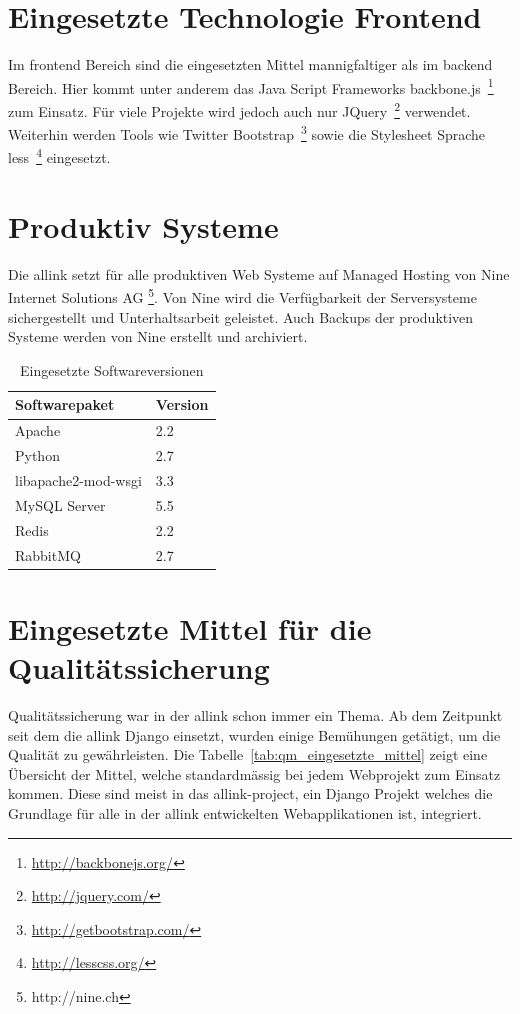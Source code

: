 \section{Eingesetzte Technologie Frontend}
\label{sec:eingesetzte_technologie_frontend}
Im frontend Bereich sind die eingesetzten Mittel mannigfaltiger als im backend Bereich. Hier kommt unter anderem das  Java Script Frameworks backbone.js~\footnote{\url{http://backbonejs.org/}} zum Einsatz. Für viele Projekte wird jedoch auch nur JQuery~\footnote{\url{http://jquery.com/}} verwendet. Weiterhin werden Tools wie Twitter Bootstrap~\footnote{\url{http://getbootstrap.com/}} sowie die Stylesheet Sprache less~\footnote{\url{http://lesscss.org/}} eingesetzt.

\section{Produktiv Systeme}
\label{sec:produktiv_systeme}
Die allink setzt für alle produktiven Web Systeme auf Managed Hosting von Nine Internet Solutions AG \footnote{http://nine.ch}. Von Nine wird die Verfügbarkeit der Serversysteme sichergestellt und Unterhaltsarbeit geleistet. Auch Backups der produktiven Systeme werden von Nine erstellt und archiviert.

\begin{table}[ht]
  \centering
  \begin{tabular}{ll}
  \toprule
    Softwarepaket & Version\\
  \midrule
    Apache & 2.2\\
  \hline
    Python & 2.7\\
  \hline
    libapache2-mod-wsgi & 3.3\\
  \hline
    MySQL Server & 5.5\\
  \hline
    Redis & 2.2\\
  \hline
    RabbitMQ & 2.7\\
  \bottomrule
  \end{tabular}
  \caption{Eingesetzte Softwareversionen}
  \label{tab:eingesetzte_softwareversionen}
\end{table}

\section{Eingesetzte Mittel für die Qualitätssicherung}
\label{sec:eingesetzte_mittel_für_die_qualitätssicherung}
Qualitätssicherung war in der allink schon immer ein Thema. Ab dem Zeitpunkt seit dem die allink Django einsetzt, wurden einige Bemühungen getätigt, um die Qualität zu gewährleisten. Die Tabelle~\ref{tab:qm_eingesetzte_mittel} zeigt eine Übersicht der Mittel, welche standardmässig bei jedem Webprojekt zum Einsatz kommen. Diese sind meist in das allink-project, ein Django Projekt welches die Grundlage für alle in der allink entwickelten Webapplikationen ist, integriert.

